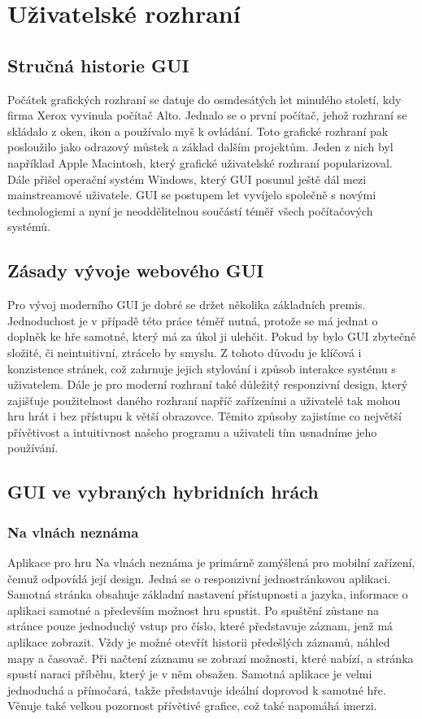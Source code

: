 \chapter{Uživatelské rozhraní}

\section{Stručná historie GUI}
Počátek grafických rozhraní se datuje do osmdesátých let minulého století, kdy firma Xerox vyvinula počítač Alto. Jednalo se o první počítač, jehož rozhraní se skládalo z oken, ikon a používalo myš k ovládání. Toto grafické rozhraní pak posloužilo jako odrazový můstek a základ dalším projektům. Jeden z nich byl například Apple Macintosh, který grafické uživatelské rozhraní popularizoval. Dále přišel operační systém Windows, který GUI posunul ještě dál mezi mainstreamové uživatele. GUI se postupem let vyvíjelo společně s novými technologiemi a nyní je neoddělitelnou součástí téměř všech počítačových systémů.

\section{Zásady vývoje webového GUI}
Pro vývoj moderního GUI je dobré se držet několika základních premis. Jednoduchost je v případě této práce téměř nutná, protože se má jednat o doplněk ke hře samotné, který má za úkol ji ulehčit. Pokud by bylo GUI zbytečně složité, či neintuitivní, ztrácelo by smyslu. Z tohoto důvodu je klíčová i konzistence stránek, což zahrnuje jejich stylování i způsob interakce systému s uživatelem. Dále je pro moderní rozhraní také důležitý responzivní design, který zajišťuje použitelnost daného rozhraní napříč zařízeními a uživatelé tak mohou hru hrát i bez přístupu k větší obrazovce. Těmito způsoby zajistíme co největší přívětivost a intuitivnost našeho programu a uživateli tím usnadníme jeho používání.

\section{GUI ve vybraných hybridních hrách}

\subsection{Na vlnách neznáma}
Aplikace pro hru Na vlnách neznáma je primárně zamýšlená pro mobilní zařízení, čemuž odpovídá její design. Jedná se o responzivní jednostránkovou aplikaci. Samotná stránka obsahuje základní nastavení přístupnosti a jazyka, informace o aplikaci samotné a především možnost hru spustit. Po spuštění zůstane na stránce pouze jednoduchý vstup pro číslo, které představuje záznam, jenž má aplikace zobrazit. Vždy je možné otevřít historii předešlých záznamů, náhled mapy a časovač. Při načtení záznamu se zobrazí možnosti, které nabízí, a stránka spustí naraci příběhu, který je v něm obsažen. Samotná aplikace je velmi jednoduchá a přímočará, takže představuje ideální doprovod k samotné hře. Věnuje také velkou pozornost přívětivé grafice, což také napomáhá imerzi.


